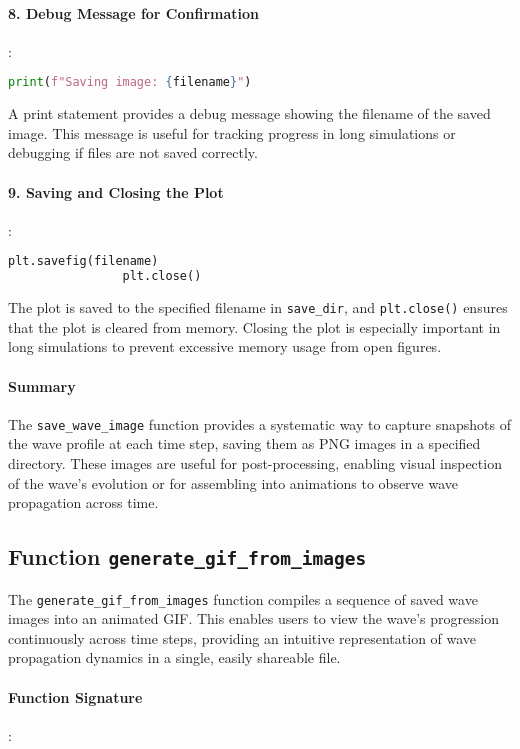 \documentclass{article}
\begin{document}
			
			\paragraph{8. Debug Message for Confirmation}
			:
			\begin{lstlisting}[language=Python]
				print(f"Saving image: {filename}")
			\end{lstlisting}
			A print statement provides a debug message showing the filename of the saved image. This message is useful for tracking progress in long simulations or debugging if files are not saved correctly.
			
			\paragraph{9. Saving and Closing the Plot}
			:
			\begin{lstlisting}[language=Python]
				plt.savefig(filename)
				plt.close()
			\end{lstlisting}
			The plot is saved to the specified filename in \texttt{save\_dir}, and \texttt{plt.close()} ensures that the plot is cleared from memory. Closing the plot is especially important in long simulations to prevent excessive memory usage from open figures.
			
			\paragraph{Summary}
			
			The \texttt{save\_wave\_image} function provides a systematic way to capture snapshots of the wave profile at each time step, saving them as PNG images in a specified directory. These images are useful for post-processing, enabling visual inspection of the wave's evolution or for assembling into animations to observe wave propagation across time.
		
		\subsection{Function \texttt{generate\_gif\_from\_images}}
	
			The \texttt{generate\_gif\_from\_images} function compiles a sequence of saved wave images into an animated GIF. This enables users to view the wave’s progression continuously across time steps, providing an intuitive representation of wave propagation dynamics in a single, easily shareable file.
			
			\paragraph{Function Signature}
			:
			
\end{document}
